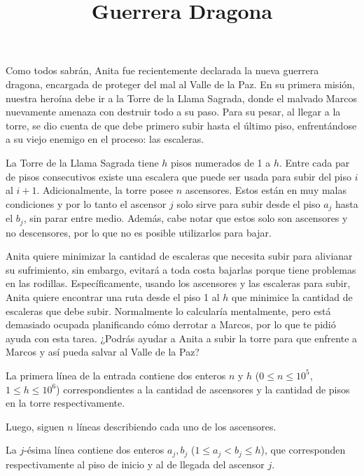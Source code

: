 \documentclass{oci}
\title{Guerrera Dragona}
\begin{document}
\begin{problemDescription}
  Como todos sabrán, Anita fue recientemente
  declarada la nueva guerrera dragona, encargada
  de proteger del mal al Valle de la Paz.
  En su primera misión, nuestra heroína debe ir
  a la Torre de la Llama Sagrada, donde
  el malvado Marcos nuevamente amenaza con
  destruir todo a su paso.
  Para su pesar, al llegar a la torre, se dio cuenta
  de que debe primero subir hasta el último piso,
  enfrentándose a su viejo enemigo en el proceso: las escaleras.


  La Torre de la Llama Sagrada tiene $h$ pisos numerados
  de 1 a $h$.
  Entre cada par de pisos consecutivos existe una
  escalera que puede ser usada para subir del piso $i$
  al $i + 1$.
  Adicionalmente, la torre posee $n$ ascensores.
  Estos están en muy malas condiciones y por lo tanto el
  ascensor $j$ solo sirve para subir desde el piso $a_j$ hasta el
  $b_j$, sin parar entre medio.
  Además, cabe notar que estos solo son ascensores y no descensores,
  por lo que no es posible utilizarlos para bajar.

  Anita quiere minimizar la cantidad de escaleras que
  necesita subir para alivianar su sufrimiento, sin embargo,
  evitará a toda costa bajarlas porque tiene
  problemas en las rodillas.
  Específicamente, usando los ascensores y las escaleras para subir,
  Anita quiere encontrar una ruta desde el piso 1 al $h$ que
  minimice la cantidad de escaleras que debe subir.
  Normalmente lo calcularía mentalmente, pero está demasiado
  ocupada planificando cómo derrotar a Marcos, por lo que
  te pidió ayuda con esta tarea.
  ¿Podrás ayudar a Anita a subir la torre para
  que enfrente a Marcos y así pueda salvar al Valle de
  la Paz?
\end{problemDescription}

\begin{inputDescription}
  La primera línea de la entrada contiene dos enteros
  $n$ y $h$ ($0 \leq n \leq 10^5$, $1 \leq h \leq 10^6$)
  correspondientes a la cantidad de ascensores y la cantidad
  de pisos en la torre respectivamente.

  Luego, siguen $n$ líneas describiendo cada uno de los ascensores.

  La $j$-ésima línea contiene dos enteros $a_j, b_j$
  ($1 \leq a_j < b_j \leq h$), que corresponden respectivamente
  al piso de inicio y al de llegada del ascensor $j$.
\end{inputDescription}
\end{document}
